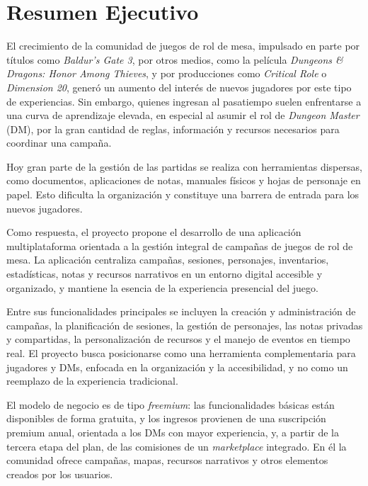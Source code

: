 \capredactadotrue
\section*{Resumen Ejecutivo}

El crecimiento de la comunidad de juegos de rol de mesa, impulsado en parte por títulos como \textit{Baldur's Gate 3}, por otros medios, como la película \textit{Dungeons \& Dragons: Honor Among Thieves}, y por producciones como \textit{Critical Role} o \textit{Dimension 20}, generó un aumento del interés de nuevos jugadores por este tipo de experiencias. Sin embargo, quienes ingresan al pasatiempo suelen enfrentarse a una curva de aprendizaje elevada, en especial al asumir el rol de \textit{Dungeon Master} (DM), por la gran cantidad de reglas, información y recursos necesarios para coordinar una campaña.

Hoy gran parte de la gestión de las partidas se realiza con herramientas dispersas, como documentos, aplicaciones de notas, manuales físicos y hojas de personaje en papel. Esto dificulta la organización y constituye una barrera de entrada para los nuevos jugadores.

Como respuesta, el proyecto propone el desarrollo de una aplicación multiplataforma orientada a la gestión integral de campañas de juegos de rol de mesa. La aplicación centraliza campañas, sesiones, personajes, inventarios, estadísticas, notas y recursos narrativos en un entorno digital accesible y organizado, y mantiene la esencia de la experiencia presencial del juego.

Entre sus funcionalidades principales se incluyen la creación y administración de campañas, la planificación de sesiones, la gestión de personajes, las notas privadas y compartidas, la personalización de recursos y el manejo de eventos en tiempo real. El proyecto busca posicionarse como una herramienta complementaria para jugadores y DMs, enfocada en la organización y la accesibilidad, y no como un reemplazo de la experiencia tradicional.

El modelo de negocio es de tipo \textit{freemium}: las funcionalidades básicas están disponibles de forma gratuita, y los ingresos provienen de una suscripción premium anual, orientada a los DMs con mayor experiencia, y, a partir de la tercera etapa del plan, de las comisiones de un \textit{marketplace} integrado. En él la comunidad ofrece campañas, mapas, recursos narrativos y otros elementos creados por los usuarios.

